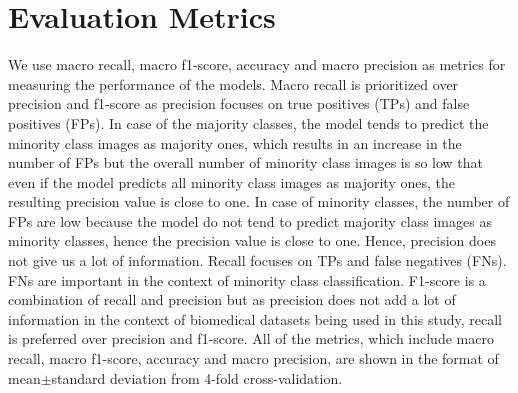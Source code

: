 \section{Evaluation Metrics}\label{section:evaluation_metrics}
We use macro recall, macro f1-score, accuracy and macro precision as metrics for measuring the performance of the models. Macro recall is prioritized over precision and f1-score as precision focuses on true positives (TPs) and false positives (FPs). In case of the majority classes, the model tends to predict the minority class images as majority ones, which results in an increase in the number of FPs but the overall number of minority class images is so low that even if the model predicts all minority class images as majority ones, the resulting precision value is close to one. In case of minority classes, the number of FPs are low because the model do not tend to predict majority class images as minority classes, hence the precision value is close to one. Hence, precision does not give us a lot of information. Recall focuses on TPs and false negatives (FNs). FNs are important in the context of minority class classification. F1-score is a combination of recall and precision but as precision does not add a lot of information in the context of biomedical datasets being used in this study, recall is preferred over precision and f1-score. All of the metrics, which include macro recall, macro f1-score, accuracy and macro precision, are shown in the format of mean$\pm$standard deviation from 4-fold cross-validation. 